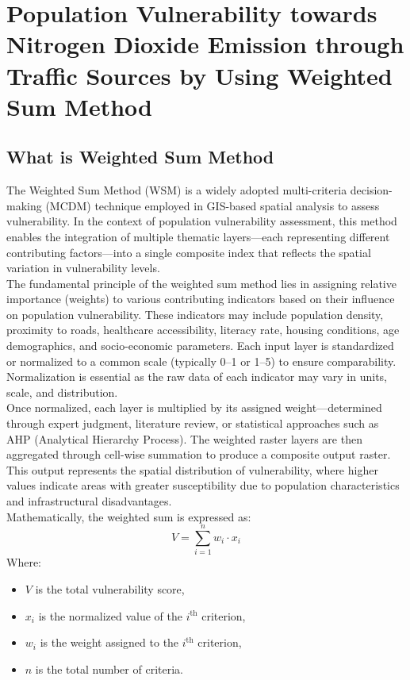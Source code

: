 \documentclass[12pt]{report}
\begin{document}
\section{Population Vulnerability towards Nitrogen Dioxide Emission through Traffic Sources by Using Weighted Sum Method}
\subsection{What is Weighted Sum Method}
The Weighted Sum Method (WSM) is a widely adopted multi-criteria decision-making (MCDM) technique employed in GIS-based spatial analysis to assess vulnerability. In the context of population vulnerability assessment, this method enables the integration of multiple thematic layers—each representing different contributing factors—into a single composite index that reflects the spatial variation in vulnerability levels.\\
The fundamental principle of the weighted sum method lies in assigning relative importance (weights) to various contributing indicators based on their influence on population vulnerability. These indicators may include population density, proximity to roads, healthcare accessibility, literacy rate, housing conditions, age demographics, and socio-economic parameters. Each input layer is standardized or normalized to a common scale (typically 0–1 or 1–5) to ensure comparability. Normalization is essential as the raw data of each indicator may vary in units, scale, and distribution.\\
Once normalized, each layer is multiplied by its assigned weight—determined through expert judgment, literature review, or statistical approaches such as AHP (Analytical Hierarchy Process). The weighted raster layers are then aggregated through cell-wise summation to produce a composite output raster. This output represents the spatial distribution of vulnerability, where higher values indicate areas with greater susceptibility due to population characteristics and infrastructural disadvantages.\\
Mathematically, the weighted sum is expressed as:\\
\[
V = \sum_{i=1}^{n} w_i \cdot x_i
\]
Where:\\
\begin{itemize}
    \item $V$ is the total vulnerability score,
    \item $x_i$ is the normalized value of the $i^{\text{th}}$ criterion,
    \item $w_i$ is the weight assigned to the $i^{\text{th}}$ criterion,
    \item $n$ is the total number of criteria.
\end{itemize}
\end{document}
